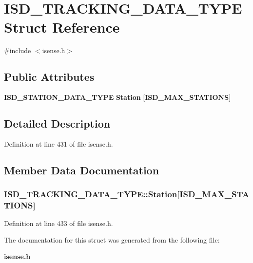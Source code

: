 \section{\-I\-S\-D\-\_\-\-T\-R\-A\-C\-K\-I\-N\-G\-\_\-\-D\-A\-T\-A\-\_\-\-T\-Y\-P\-E \-Struct \-Reference}
\label{structISD__TRACKING__DATA__TYPE}


{\ttfamily \#include $<$isense.\-h$>$}

\subsection*{\-Public \-Attributes}
\begin{DoxyCompactItemize}
\item 
{\bf \-I\-S\-D\-\_\-\-S\-T\-A\-T\-I\-O\-N\-\_\-\-D\-A\-T\-A\-\_\-\-T\-Y\-P\-E} {\bf \-Station} [{\bf \-I\-S\-D\-\_\-\-M\-A\-X\-\_\-\-S\-T\-A\-T\-I\-O\-N\-S}]
\end{DoxyCompactItemize}


\subsection{\-Detailed \-Description}


\-Definition at line 431 of file isense.\-h.



\subsection{\-Member \-Data \-Documentation}
\subsubsection[{\-Station}]{ {\bf \-I\-S\-D\-\_\-\-T\-R\-A\-C\-K\-I\-N\-G\-\_\-\-D\-A\-T\-A\-\_\-\-T\-Y\-P\-E\-::\-Station}[{\bf \-I\-S\-D\-\_\-\-M\-A\-X\-\_\-\-S\-T\-A\-T\-I\-O\-N\-S}]}\label{structISD__TRACKING__DATA__TYPE_ab90feb278d31ffa14e4720e28fa4e25a}


\-Definition at line 433 of file isense.\-h.



\-The documentation for this struct was generated from the following file\-:\begin{DoxyCompactItemize}
\item 
{\bf isense.\-h}\end{DoxyCompactItemize}
